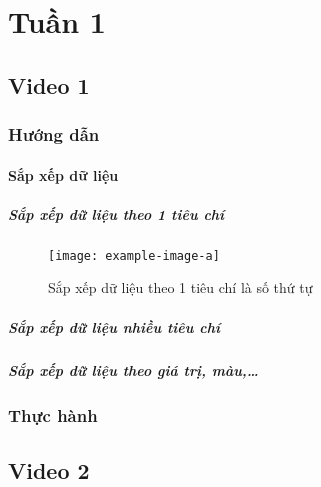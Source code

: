 \documentclass{article}
\begin{document}
\section{Tuần 1}



\subsection{Video 1}

\subsubsection{Hướng dẫn}

\paragraph{Sắp xếp dữ liệu}
\subparagraph{Sắp xếp dữ liệu theo 1 tiêu chí}






\begin{figure}[h]
    \centering
    \texttt{[image: example-image-a]}
    \caption{Sắp xếp dữ liệu theo 1 tiêu chí là số thứ tự}
\end{figure}


 
\subparagraph{Sắp xếp dữ liệu nhiều tiêu chí}

\subparagraph{Sắp xếp dữ liệu theo giá trị, màu,\dots}













\subsubsection{Thực hành}



\subsection{Video 2}
\end{document}
